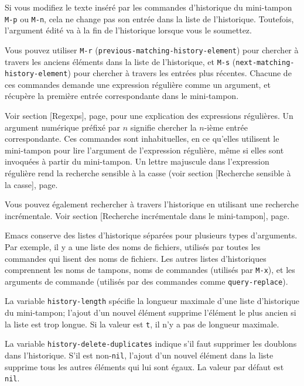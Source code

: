 Si vous modifiez le texte inséré par les commandes d'historique du
mini-tampon \texttt{M-p} ou \texttt{M-n}, cela ne change pas son
entrée dans la liste de l'historique. Toutefois, l'argument édité va à
la fin de l'historique lorsque vous le soumettez.

Vous pouvez utiliser \texttt{M-r}
(\texttt{previous-matching-history-element}) pour chercher à travers
les anciens éléments dans la liste de l'historique, et \texttt{M-s}
(\texttt{next-matching-history-element}) pour chercher à travers les
entrées plus récentes. Chacune de ces commandes demande une expression
régulière comme un argument, et récupère la première entrée
correspondante dans le mini-tampon. 

Voir section [Regexps], page, pour une
explication des expressions régulières. Un argument numérique préfixé
par $n$ signifie chercher la $n$-ième entrée correspondante. Ces
commandes sont inhabituelles, en ce qu'elles utilisent le mini-tampon
pour lire l'argument de l'expression régulière, même si elles sont
invoquées à partir du mini-tampon. Un lettre majuscule dans
l'expression régulière rend la recherche sensible à la casse (voir
section [Recherche sensible à la casse],
page.

Vous pouvez également rechercher à travers l'historique en utilisant
une recherche incrémentale. Voir
section [Recherche incrémentale dans le mini-tampon],
page. 

Emacs conserve des listes d'historique séparées pour plusieurs types
d'arguments. Par exemple, il y a une liste des noms de fichiers,
utilisés par toutes les commandes qui lisent des noms de
fichiers. Les autres listes d'historiques comprennent les noms de
tampons, noms de commandes (utilisés par \texttt{M-x}), et les
arguments de commande (utilisés par des commandes comme
\texttt{query-replace}). 

La variable \texttt{history-length} spécifie la longueur maximale
d'une liste d'historique du mini-tampon; l'ajout d'un nouvel élément
supprime l'élément le plus ancien si la liste est trop longue. Si la
valeur est \texttt{t}, il n'y a pas de longueur maximale.

La variable \texttt{history-delete-duplicates} indique s'il faut
supprimer les doublons dans l'historique. S'il est non-\texttt{nil},
l'ajout d'un nouvel élément dans la liste supprime tous les autres
éléments qui lui sont égaux. La valeur par défaut est \texttt{nil}. 

